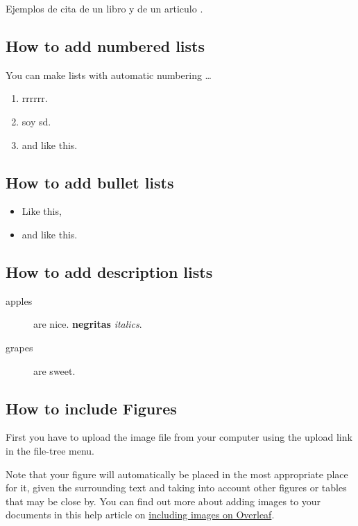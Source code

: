 \documentclass[12pt]{report} %
\begin{document}
Ejemplos de cita de un libro \cite{Andersson2020} y 
de un articulo \cite{Samer2017}.



 
\subsection{How to add numbered lists}

You can make lists with automatic numbering \dots

\begin{enumerate}
  \item rrrrrr.
  \item    soy sd.
  \item and like this.
\end{enumerate}


\subsection{How to add bullet lists}

\begin{itemize}
 \item Like this,
 \item and like this.
\end{itemize}


\subsection{How to add description lists}

\begin{description}
 \item[apples] are nice. \textbf{negritas} \textit{italics}.
 \item[grapes] are sweet.
\end{description}


\subsection{How to include Figures}
First you have to upload the image file from your computer using the upload link in the file-tree menu.  

Note that your figure will automatically be placed in the most appropriate place for it, given the surrounding text and taking into account other figures or tables that may be close by. You can find out more about adding images to your documents in this help article on \href{https://www.overleaf.com/learn/how-to/Including_images_on_Overleaf}{including images on Overleaf}.
 
\end{document}
